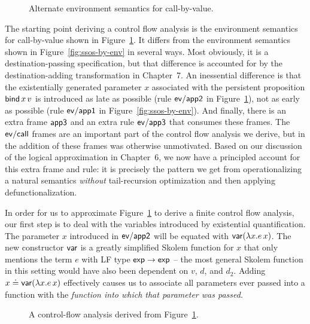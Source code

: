\begin{figure}
\caption{Alternate environment semantics for call-by-value.}
\label{fig:dest-env}
\end{figure}

The starting point deriving a control flow analysis is the environment
semantics for call-by-value shown in Figure~\ref{fig:dest-env}. It
differs from the environment semantics shown in
Figure~\ref{fig:ssos-by-env} in several ways. Most obviously, it is a
destination-passing specification, but that difference is accounted
for by the destination-adding transformation in Chapter~7.  An
inessential difference is that the existentially generated parameter
$x$ associated with the persistent proposition ${\sf bind}\,x\,v$ is
introduced as late as possible (rule ${\sf ev/app2}$ in
Figure~\ref{fig:dest-env}), not as early as possible (rule ${\sf
  ev/app1}$ in Figure~\ref{fig:ssos-by-env}). And finally, there is an
extra frame ${\sf app3}$ and an extra rule ${\sf ev/app3}$ that
consumes these frames. The ${\sf ev/call}$ frames are an important
part of the control flow analysis we derive, but in
\cite{simmons11logical} the addition of these frames was otherwise
unmotivated. Based on our discussion of the logical
approximation in Chapter~6, we now have a principled account for this
extra frame and rule: it is precisely the pattern we get from
operationalizing a natural semantics {\it without} tail-recursion
optimization and then applying defunctionalization. 

In order for us to approximate Figure~\ref{fig:dest-env} to derive a
finite control flow analysis, our first step is to deal with the
variables introduced by existential quantification. The parameter $x$
introduced in ${\sf ev/app2}$ will be equated with ${\sf var}(\lambda
x.e\,x)$. The new constructor ${\sf var}$ is a greatly simplified
Skolem function for $x$ that only mentions the term $e$ with LF type
${\sf exp} \rightarrow {\sf exp}$ -- the most general Skolem function
in this setting would have also been dependent on $v$, $d$, and
$d_2$. Adding $x \doteq {\sf var}(\lambda x.e\,x)$ effectively causes
us to associate all parameters ever passed into a function with the
{\it function into which that parameter was passed}. 

\begin{figure}
\caption{A control-flow analysis derived from Figure~\ref{fig:dest-env}.}
\label{fig:dest-cfa-1}
\end{figure}

